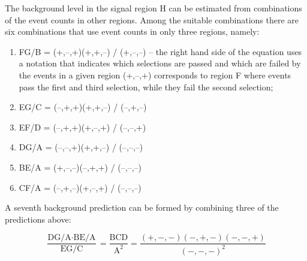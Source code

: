 The background level in the signal region H can be estimated from combinations
of the event counts in other regions. Among the suitable combinations 
there are six combinations that use event counts in only
three regions, namely:
\begin{enumerate}
 \item FG/B = (+,--,+)(+,+,--) / (+,--,--) -- the right hand side of the equation uses
 a notation that indicates which selections are passed and which are failed by 
 the events in a given region
 \ie (+,--,+) corresponds to region F where events pass the first and third selection,
 while they fail the second selection;
 \item EG/C = (--,+,+)(+,+,--) / (--,+,--)
 \item EF/D = (--,+,+)(+,--,+) / (--,--,+)
 \item DG/A = (--,--,+)(+,+,--) / (--,--,--)
 \item BE/A = (+,--,--)(--,+,+) / (--,--,--)
 \item CF/A = (--,+,--)(+,--,+) / (--,--,--)
\end{enumerate}




A seventh background prediction can be formed by combining three of the predictions above:

\begin{equation}
\frac{\text{DG/A}\cdot\text{BE/A}}{\text{EG/C}} = \frac{\text{BCD}}{\text{A}^2} = \frac{(+,-,-)(-,+,-)(-,-,+)}{(-,-,-)^2}
\end{equation}


